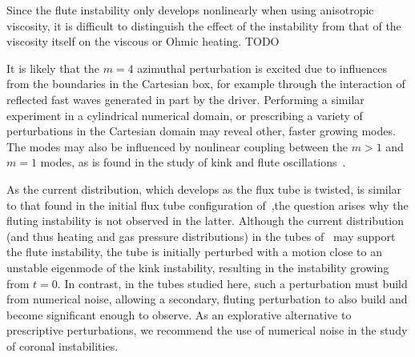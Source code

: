 \documentclass[fleqn,usenatbib]{mnras}
\newcommand{\rev}[1]{{\color{red} {#1}}}
\begin{document}
\rev{Since the flute instability only develops nonlinearly when using anisotropic viscosity, it is difficult to distinguish the effect of the instability from that of the viscosity itself on the viscous or Ohmic heating. TODO}

It is likely that the $m=4$ azimuthal perturbation is excited due to influences
from the boundaries in the Cartesian box, for example through the interaction
of reflected fast waves generated in part by the driver. Performing a similar
experiment in a cylindrical numerical domain, or prescribing a variety of
perturbations in the Cartesian domain may reveal other, faster growing modes.
The modes may also be influenced by nonlinear coupling between the $m>1$ and
$m=1$ modes, as is found in the study of kink and flute
oscillations~\citep{terradasEffectMagneticTwist2018,rudermanNonlinearGenerationFluting2017}. 

As the current distribution, which develops as the flux tube is twisted, is
similar to that found in the initial flux tube configuration
of~\cite{quinnEffectAnisotropicViscosity2020},the question arises why the
fluting instability is not observed in the latter. Although the current
distribution (and thus heating and \rev{gas} pressure distributions) in the tubes
of~\cite{quinnEffectAnisotropicViscosity2020} may support the flute
instability, the tube is initially perturbed with a motion close to an unstable
eigenmode of the kink instability, resulting in the instability growing from
$t=0$. In contrast, in the tubes studied here, such a perturbation must build
from numerical noise, allowing a secondary, fluting perturbation to also build
and become significant enough to observe. \rev{As an explorative alternative to
prescriptive perturbations, we recommend the use of numerical noise in the
study of coronal instabilities.}
\end{document}
